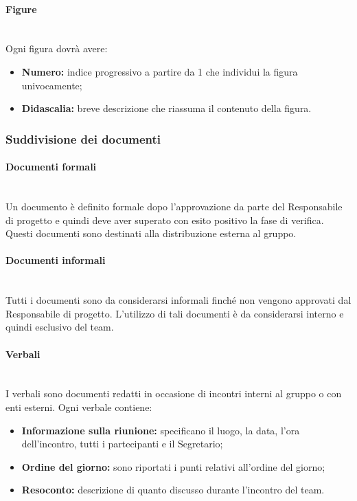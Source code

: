 \documentclass[11pt,a4paper]{article}
\begin{document}
	
	
	\paragraph{Figure}
\noindent \\	
	Ogni figura dovrà avere:
	\begin{itemize}
		\item \textbf{Numero:} indice progressivo a partire da 1 che individui la figura univocamente;
		\item \textbf{Didascalia:} breve descrizione che riassuma il contenuto della figura.
	\end{itemize}
	
	\subsubsection{Suddivisione dei documenti}
	\paragraph{Documenti formali}
	\noindent \\ Un documento è definito formale dopo l’approvazione da parte del Responsabile di progetto e quindi deve aver superato con esito positivo la fase di verifica. Questi documenti sono destinati alla distribuzione esterna al gruppo.
	
	\paragraph{Documenti informali}
	\noindent \\ Tutti i documenti sono da considerarsi informali finché non vengono approvati dal Responsabile di progetto. L’utilizzo di tali documenti è da considerarsi interno e quindi esclusivo del team.
	
	\paragraph{Verbali}
	\noindent \\ I verbali sono documenti redatti in occasione di incontri interni al gruppo o con enti esterni. Ogni verbale contiene:
	
	\begin{itemize}
	\item \textbf{Informazione sulla riunione:} specificano il luogo, la data, l'ora dell’incontro, tutti i partecipanti e il Segretario;
	\item \textbf{Ordine del giorno:} sono riportati i punti relativi all’ordine del giorno;
	\item \textbf{Resoconto:} descrizione di quanto discusso durante l'incontro del team.
	\end{itemize}
	
\end{document}
